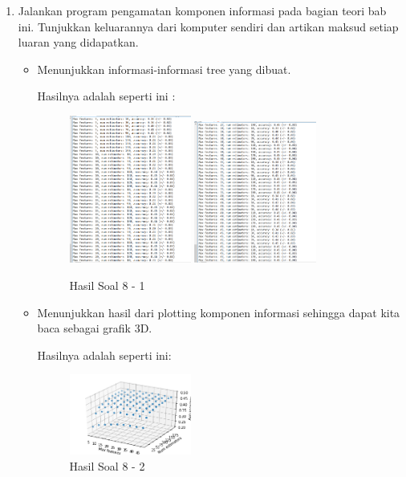 \begin{enumerate}

\item Jalankan program pengamatan komponen informasi pada bagian teori bab ini. Tunjukkan keluarannya dari komputer sendiri dan artikan maksud setiap luaran yang didapatkan.
	\hfill\break
\begin{itemize}
	\item Menunjukkan informasi-informasi tree yang dibuat.
	
	Hasilnya adalah seperti ini :

	\begin{figure}[H]
	\centering
		\includegraphics[width=4cm]{figures/1174017/3/praktek/soal81.PNG}
		\includegraphics[width=4cm]{figures/1174017/3/praktek/soal82.PNG}
		\caption{Hasil Soal 8 - 1}
	\end{figure}

	\item Menunjukkan hasil dari plotting komponen informasi sehingga dapat kita baca sebagai grafik 3D.
	
	Hasilnya adalah seperti ini:

	\begin{figure}[H]
	\centering
		\includegraphics[width=4cm]{figures/1174017/3/praktek/soal83.PNG}
		\caption{Hasil Soal 8 - 2}
	\end{figure}
\end{itemize}
\end{enumerate}



